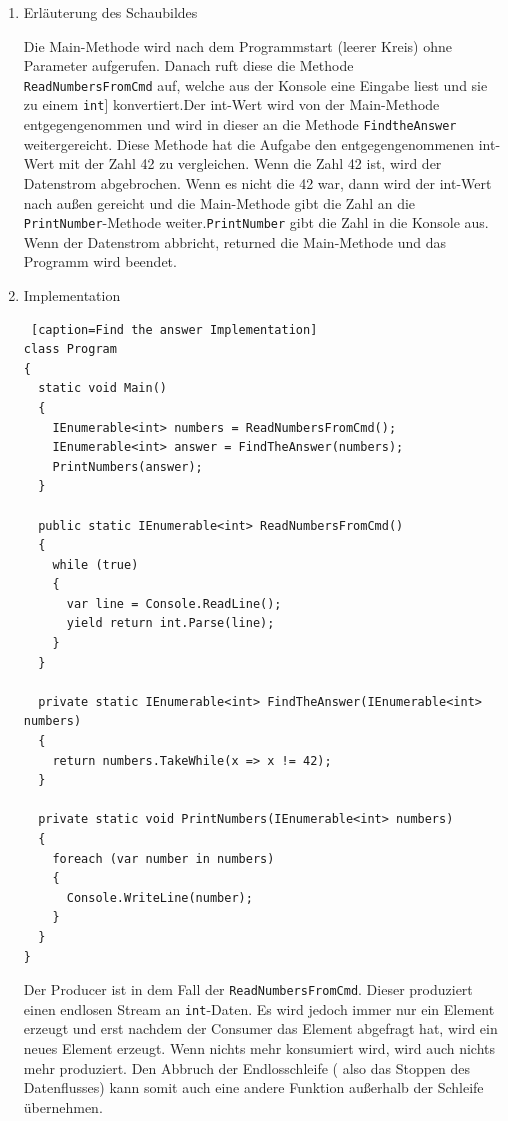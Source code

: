 \begin{enumerate}
\item Erläuterung des Schaubildes

Die  Main-Methode wird nach dem Programmstart (leerer Kreis) ohne Parameter aufgerufen.
Danach ruft diese die Methode \\\texttt{ReadNumbersFromCmd} auf, welche aus der Konsole eine Eingabe liest und sie
zu einem  \texttt{int}] konvertiert.Der int-Wert wird von der Main-Methode entgegengenommen und wird in dieser an die Methode \texttt{FindtheAnswer} weitergereicht.
Diese Methode hat die Aufgabe den entgegengenommenen int-Wert mit der Zahl 42 zu vergleichen. Wenn die Zahl 42 ist, wird der Datenstrom
abgebrochen. Wenn es nicht die 42 war, dann wird der int-Wert nach außen gereicht und die Main-Methode gibt die Zahl an die
\\\texttt{PrintNumber}-Methode weiter.\texttt{PrintNumber} gibt die Zahl in die Konsole aus.
Wenn der Datenstrom abbricht, returned die Main-Methode und das Programm wird beendet.

\item Implementation


\begin{lstlisting} [caption=Find the answer Implementation]
class Program
{
  static void Main()
  {
    IEnumerable<int> numbers = ReadNumbersFromCmd();
    IEnumerable<int> answer = FindTheAnswer(numbers);
    PrintNumbers(answer);
  }

  public static IEnumerable<int> ReadNumbersFromCmd()
  {
    while (true)
    {
      var line = Console.ReadLine();
      yield return int.Parse(line);
    }
  }

  private static IEnumerable<int> FindTheAnswer(IEnumerable<int> numbers)
  {
    return numbers.TakeWhile(x => x != 42);
  }

  private static void PrintNumbers(IEnumerable<int> numbers)
  {
    foreach (var number in numbers)
    {
      Console.WriteLine(number);
    }
  }
}
\end{lstlisting}

Der Producer ist in dem Fall der \texttt{ReadNumbersFromCmd}.
Dieser produziert einen endlosen Stream an \texttt{int}-Daten.
Es wird jedoch immer nur ein Element erzeugt und erst nachdem der Consumer das
Element abgefragt hat, wird ein neues Element erzeugt.
Wenn nichts mehr konsumiert wird, wird auch nichts mehr produziert.
Den Abbruch der Endlosschleife ( also das Stoppen des Datenflusses) kann somit auch eine andere Funktion außerhalb der Schleife
übernehmen.
\end{enumerate}




